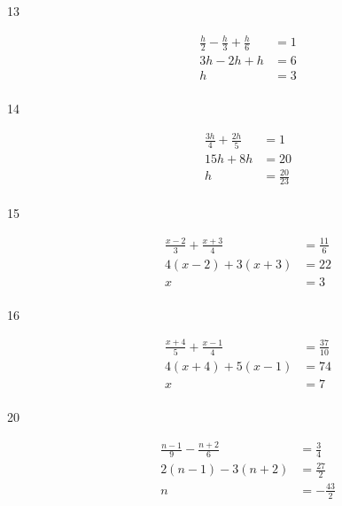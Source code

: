 \documentclass[letterpaper]{exam}
\begin{document}
\begin{description}
      \item[13] 
        \begin{align*}
          \frac{h}{2} - \frac{h}{3} + \frac{h}{6} & = 1 \\
          3h - 2h + h                             & = 6 \\
          h                                       & = \boxed{ 3 } \\
        \end{align*}

      \item[14] 
        \begin{align*}
          \frac{3h}{4} + \frac{2h}{5} & = 1 \\
          15h + 8h                    & = 20 \\
          h                           & = \boxed{ \frac{20}{23} } \\
        \end{align*}

      \item[15] 
        \begin{align*}
          \frac{x - 2}{3} + \frac{x + 3}{4} & = \frac{11}{6} \\
          4(x - 2) + 3(x + 3)               & = 22 \\
          x                                 & = \boxed{ 3 } \\
        \end{align*}

      \item[16] 
        \begin{align*}
          \frac{x + 4}{5} + \frac{x - 1}{4} & = \frac{37}{10} \\
          4 (x + 4) + 5 (x - 1)             & = 74 \\
          x                                 & = \boxed{ 7 } \\
        \end{align*}

      \item[20] 
        \begin{align*}
          \frac{n - 1}{9} - \frac{n + 2}{6} & = \frac{3}{4} \\
          2(n - 1) - 3(n + 2)               & = \frac{27}{2} \\
          n                                 & = \boxed{ - \frac{43}{2} } \\
        \end{align*}


\end{description}
\end{document}
